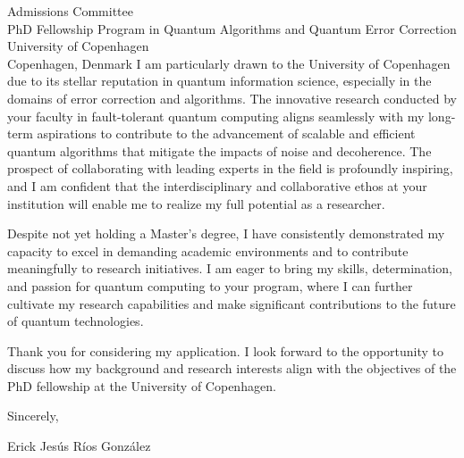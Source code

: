 \documentclass[a4paper,10pt]{letter}
\begin{document}
\begin{letter}{Admissions Committee\\
PhD Fellowship Program in Quantum Algorithms and Quantum Error Correction\\
University of Copenhagen\\
Copenhagen, Denmark}
I am particularly drawn to the University of Copenhagen due to its stellar reputation in quantum information science, especially in the domains of error correction and algorithms. The innovative research conducted by your faculty in fault-tolerant quantum computing aligns seamlessly with my long-term aspirations to contribute to the advancement of scalable and efficient quantum algorithms that mitigate the impacts of noise and decoherence. The prospect of collaborating with leading experts in the field is profoundly inspiring, and I am confident that the interdisciplinary and collaborative ethos at your institution will enable me to realize my full potential as a researcher.

Despite not yet holding a Master's degree, I have consistently demonstrated my capacity to excel in demanding academic environments and to contribute meaningfully to research initiatives. I am eager to bring my skills, determination, and passion for quantum computing to your program, where I can further cultivate my research capabilities and make significant contributions to the future of quantum technologies.

Thank you for considering my application. I look forward to the opportunity to discuss how my background and research interests align with the objectives of the PhD fellowship at the University of Copenhagen.

Sincerely,

\closing{Erick Jesús Ríos González}
\end{letter}
\end{document}
